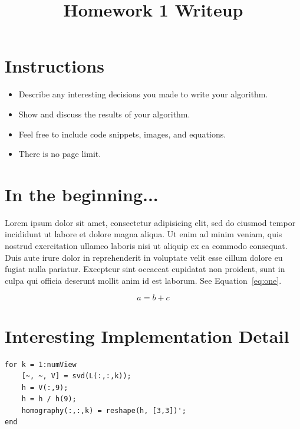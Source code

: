 \title{\vspace{-1cm}Homework 1 Writeup}



\maketitle
\vspace{-3cm}
\thispagestyle{fancy}

\section*{Instructions}
\begin{itemize}
  \item Describe any interesting decisions you made to write your algorithm.
  \item Show and discuss the results of your algorithm.
  \item Feel free to include code snippets, images, and equations.
  \item There is no page limit.
  
\end{itemize}

\section*{In the beginning...}

Lorem ipsum dolor sit amet, consectetur adipisicing elit, sed do eiusmod tempor incididunt ut labore et dolore magna aliqua. Ut enim ad minim veniam, quis nostrud exercitation ullamco laboris nisi ut aliquip ex ea commodo consequat. Duis aute irure dolor in reprehenderit in voluptate velit esse cillum dolore eu fugiat nulla pariatur. Excepteur sint occaecat cupidatat non proident, sunt in culpa qui officia deserunt mollit anim id est laborum. See Equation~\ref{eq:one}.

\begin{equation}
a = b + c
\label{eq:one}
\end{equation}

\section*{Interesting Implementation Detail}

\begin{lstlisting}[style=Matlab-editor]
for k = 1:numView
    [~, ~, V] = svd(L(:,:,k));
    h = V(:,9);
    h = h / h(9);
    homography(:,:,k) = reshape(h, [3,3])';
end
\end{lstlisting}

